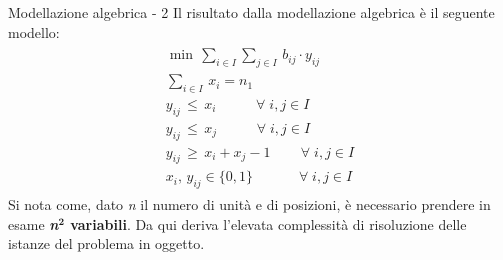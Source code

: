 \documentclass[a4paper]{beamer}
\begin{document}
\begin{frame}{Modellazione algebrica - 2}
Il risultato dalla modellazione algebrica è il seguente modello:
\begin{align*}
	\begin{array}{l}
      \min \, \sum_{i\in I} \sum_{j\in I} \, b_{ij}\cdot y_{ij} \\
      \sum_{i\in I} \, x_{i} = n_1 \\
      y_{ij} \, \leq \, x_{i}   \;\;\;\qquad \forall \; i,j \in I \\ 
      y_{ij} \, \leq \, x_{j}   \;\;\;\qquad \forall \; i,j \in I \\
      y_{ij} \, \geq \, x_{i} + x_{j} - 1      \,\qquad \forall \; i,j \in I\\
      x_{i} ,\, y_{ij} \in \{0,1\}      \;\quad\qquad \forall \; i,j \in I
    \end{array}
\end{align*}
\vfill
Si nota come, dato \textit{n} il numero di unità e di posizioni, è necessario prendere in esame \textbf{\textit{n}$^{\textbf{2}}$ variabili}. 
Da qui deriva l'elevata complessità di risoluzione delle istanze del problema in oggetto.
\end{frame}
\end{document}
